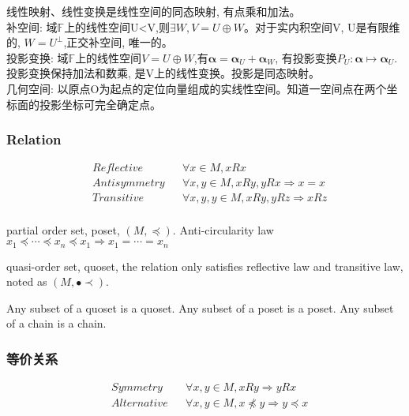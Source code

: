 \documentclass[UTF8]{../../09-Mathematics}
\begin{document}
线性映射、线性变换是线性空间的同态映射, 有点乘和加法。\\
补空间: 域$\mathbb F$上的线性空间U<V,则$\exists W, V=U \oplus W$。对于实内积空间V, U是有限维的, $W=U^{\perp}$,正交补空间, 唯一的。\\
投影变换: 域$\mathbb F$上的线性空间$V=U \oplus W$,有$\mathbf \alpha =\mathbf \alpha _U+\mathbf \alpha _W$, 有投影变换$P_U:\mathbf \alpha \mapsto \mathbf \alpha _U$.投影变换保持加法和数乘, 是V上的线性变换。投影是同态映射。\\
几何空间: 以原点O为起点的定位向量组成的实线性空间。知道一空间点在两个坐标面的投影坐标可完全确定点。




\subsubsection{Relation}

\begin{equation}
  \begin{aligned}
  &Reflective & & \forall x \in M, x R x\\
  &Antisymmetry & & \forall x,y \in M, x R y, yRx \Rightarrow x = x\\
  &Transitive & & \forall x,y,y \in M, x R y, y R z \Rightarrow x R z\\
  \end{aligned}
\end{equation}


partial order set, poset, $(M, \preceq )$. Anti-circularity law $x_1 \preceq \cdots \preceq x_n \preceq x_1  \Rightarrow x_1 = \cdots = x_n$

quasi-order set, quoset, the relation only satisfies reflective law and transitive law, noted as $(M, \bullet \prec )$.

\begin{proposition}
  Any subset of a quoset is a quoset.
  Any subset of a poset is a poset.
  Any subset of a chain is a chain. 
\end{proposition}


\subsubsection{等价关系}

\begin{equation}
  \begin{aligned}
  &Symmetry & & \forall x,y \in M, x R y \Rightarrow  y R x\\
  &Alternative & & \forall x,y \in M, x \npreceq  y \Rightarrow  y \preceq x\\
  \end{aligned}
\end{equation}
\end{document}
